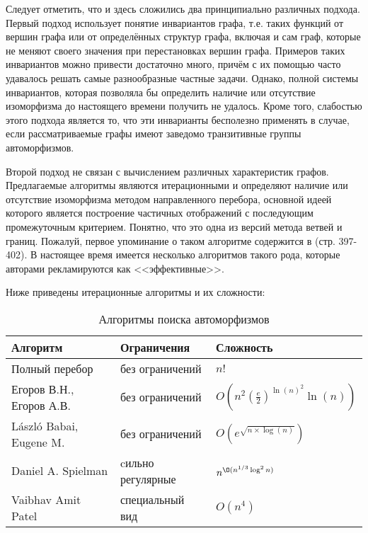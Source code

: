 Следует отметить, что и здесь сложились два принципиально различных подхода. Первый подход использует понятие инвариантов графа, т.е. таких функций от вершин графа или от определённых структур графа, включая и сам граф, которые не меняют своего значения при перестановках вершин графа. Примеров таких инвариантов можно привести достаточно много, причём с их помощью часто удавалось решать самые разнообразные частные задачи. Однако, полной системы инвариантов, которая позволяла бы определить наличие или отсутствие изоморфизма до настоящего времени получить не удалось. Кроме того, слабостью этого подхода является то, что эти инварианты бесполезно применять в случае, если рассматриваемые графы имеют заведомо транзитивные группы автоморфизмов.

Второй подход не связан с вычислением различных характеристик графов. Предлагаемые алгоритмы являются итерационными и определяют наличие или отсутствие изоморфизма методом направленного перебора, основной идеей которого является построение частичных отображений с последующим промежуточным критерием. Понятно, что это одна из версий метода ветвей и границ. Пожалуй, первое упоминание о таком алгоритме содержится в \cite{Book_Reingold} (стр. 397-402). В настоящее время имеется несколько алгоритмов такого рода, которые авторами рекламируются как <<эффективные>>.

Ниже приведены итерационные алгоритмы и их сложности:

\begin{table}[h]
\centering
\begin{tabular}[t]{|l|l|l|}
\hline
\textbf{Алгоритм} & \textbf{Ограничения} & \textbf{Сложность}\\
\hline
Полный перебор & без ограничений & $n!$\\
\hline
Егоров В.Н., Егоров А.В. \cite{ArtMain_Egorov} & без ограничений & $O(n^2(\frac{e}{2})^{\ln(n)^2} \ln(n))$\\
\hline
László Babai, Eugene M. \cite{CanocialLabeling_Babai} & без ограничений & $O(e^{\sqrt{n \times \log(n)}})$\\
\hline
Daniel A. Spielman \cite{Srg_Daniel} & cильно регулярные & $n^{\O({n^{1/3}\log^{2} n})}$\\
\hline
Vaibhav Amit Patel & специальный вид & $O(n^4)$\\
\hline
\end{tabular}
\caption{Алгоритмы поиска автоморфизмов}
\label{tabular:algos}
\end{table}
